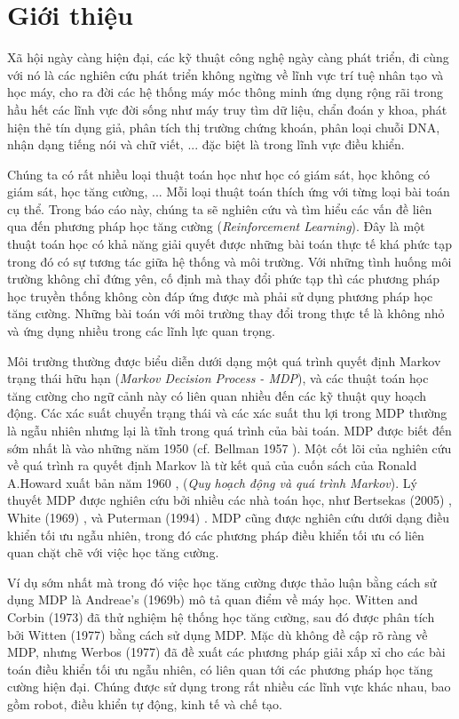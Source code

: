 \chapter{Giới thiệu}
\label{ch:intro}
	Xã hội ngày càng hiện đại, các kỹ thuật công nghệ ngày càng phát triển, đi cùng với nó là các nghiên cứu phát triển không ngừng về lĩnh vực trí tuệ nhân tạo và học máy, cho ra đời các hệ thống máy móc thông minh ứng dụng rộng rãi trong hầu hết các lĩnh vực đời sống như máy truy tìm dữ liệu, chẩn đoán y khoa, phát hiện thẻ tín dụng giả, phân tích thị trường chứng khoán, phân loại chuỗi DNA, nhận dạng tiếng nói và chữ viết, ... đặc biệt là trong lĩnh vực điều khiển.
	
	Chúng ta có rất nhiều loại thuật toán học như học có giám sát, học không có giám sát, học tăng cường, ... Mỗi loại thuật toán thích ứng với từng loại bài toán cụ thể. Trong báo cáo này, chúng ta sẽ nghiên cứu và tìm hiểu các vấn đề liên qua đến phương pháp học tăng cường (\textit{Reinforcement Learning}). Đây là một thuật toán học có khả năng giải quyết được những bài toán thực tế khá phức tạp trong đó có sự tương tác giữa hệ thống và môi trường. Với những tình huống môi trường không chỉ đứng yên, cố định mà thay đổi phức tạp thì các phương pháp học truyền thống không còn đáp ứng được mà phải sử dụng phương pháp học tăng cường. Những bài toán với môi trường thay đổi trong thực tế là không nhỏ và ứng dụng nhiều trong các lĩnh lực quan trọng.
	
	Môi trường thường được biểu diễn dưới dạng một quá trình quyết định Markov trạng thái hữu hạn (\textit{Markov Decision Process - MDP}), và các thuật toán học tăng cường cho ngữ cảnh này có liên quan nhiều đến các kỹ thuật quy hoạch động. Các xác suất chuyển trạng thái và các xác suất thu lợi trong MDP thường là ngẫu nhiên nhưng lại là tĩnh trong quá trình của bài toán. MDP được biết đến sớm nhất là vào những năm 1950 (cf. Bellman 1957 \cite{Belman1957}). Một cốt lõi của nghiên cứu về quá trình ra quyết định Markov là từ kết quả của cuốn sách của Ronald A.Howard xuất bản năm 1960  \cite{Howard1960}, (\textit{Quy hoạch động và quá trình Markov}). Lý thuyết MDP được nghiên cứu bởi nhiều các nhà toán học, như  Bertsekas (2005) \cite{Bertsekas2005} , White (1969) \cite{White1969}, và Puterman (1994) \cite{Puterman1994}. MDP cũng được nghiên cứu dưới dạng điều khiển tối ưu ngẫu nhiên, trong đó các phương pháp điều khiển tối ưu  có liên quan chặt chẽ với việc học tăng cường.
	
		Ví dụ sớm nhất mà  trong đó việc học tăng cường được thảo luận bằng cách sử dụng  MDP là Andreae’s (1969b) \cite{Andreae1969b} mô tả  quan điểm về máy học. Witten and Corbin (1973) \cite{Witten1973} đã thử nghiệm hệ thống học tăng cường, sau đó được phân tích bởi Witten (1977) \cite{Witten1977} bằng cách sử dụng MDP. Mặc dù không đề cập rõ ràng về MDP, nhưng Werbos (1977) \cite{Werbos1977} đã đề xuất các phương pháp giải xấp xỉ cho các bài toán điều khiển tối ưu ngẫu nhiên, có liên quan tới các phương pháp học tăng cường hiện đại. Chúng được sử dụng trong rất nhiều các lĩnh vực khác nhau, bao gồm robot, điều khiển tự động, kinh tế và chế tạo.\\
	
